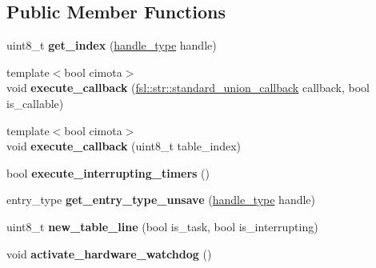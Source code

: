 \subsection*{Public Member Functions}
\begin{DoxyCompactItemize}
\item 
\mbox{\label{classfsl_1_1os_1_1scheduler_adc986c97fa6b3432e0d1836151cbfe05}} 
uint8\+\_\+t {\bfseries get\+\_\+index} (\mbox{\hyperlink{classfsl_1_1lg_1_1range__int}{handle\+\_\+type}} handle)
\item 
\mbox{\label{classfsl_1_1os_1_1scheduler_a3507b791f7ed9ce74178a350c1b6dbbd}} 
{\footnotesize template$<$bool cimota$>$ }\\void {\bfseries execute\+\_\+callback} (\mbox{\hyperlink{classfsl_1_1str_1_1union__callback}{fsl\+::str\+::standard\+\_\+union\+\_\+callback}} callback, bool is\+\_\+callable)
\item 
\mbox{\label{classfsl_1_1os_1_1scheduler_adbbf8da8de0880c8c58d4e81de40a322}} 
{\footnotesize template$<$bool cimota$>$ }\\void {\bfseries execute\+\_\+callback} (uint8\+\_\+t table\+\_\+index)
\item 
\mbox{\label{classfsl_1_1os_1_1scheduler_a2801bce2f6643fa3d9adc505fac61409}} 
bool {\bfseries execute\+\_\+interrupting\+\_\+timers} ()
\item 
\mbox{\label{classfsl_1_1os_1_1scheduler_a143bf58112b9189970c53e4763d598a2}} 
entry\+\_\+type {\bfseries get\+\_\+entry\+\_\+type\+\_\+unsave} (\mbox{\hyperlink{classfsl_1_1lg_1_1range__int}{handle\+\_\+type}} handle)
\item 
\mbox{\label{classfsl_1_1os_1_1scheduler_a7d9b2dd9e8a01cf2114653f4e9ff9535}} 
uint8\+\_\+t {\bfseries new\+\_\+table\+\_\+line} (bool is\+\_\+task, bool is\+\_\+interrupting)
\item 
\mbox{\label{classfsl_1_1os_1_1scheduler_a60e62b5b5168ca25067271eb6fde685e}} 
void {\bfseries activate\+\_\+hardware\+\_\+watchdog} ()
\item 
\mbox{\label{classfsl_1_1os_1_1scheduler_a59a6da5aa45a565dec7d9613fb14f408}} 

\end{DoxyCompactItemize}
